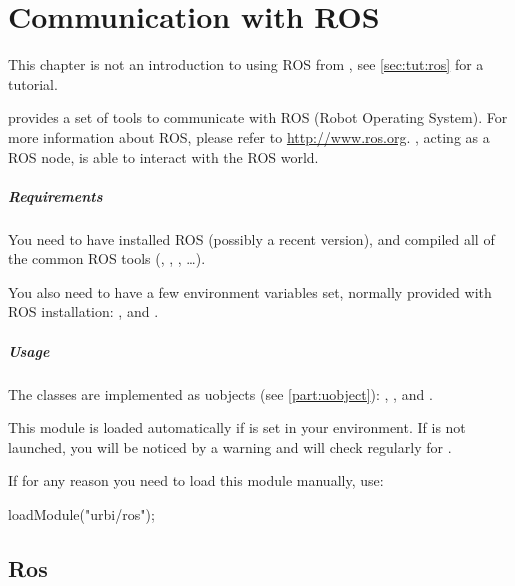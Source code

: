 
\chapter{Communication with ROS}
\label{sec:specs:ros}

This chapter is not an introduction to using ROS from \urbi, see
\autoref{sec:tut:ros} for a tutorial.

\urbi provides a set of tools to communicate with ROS (Robot Operating
System). For more information about ROS, please refer to
\url{http://www.ros.org}.  \urbi, acting as a ROS node, is able to interact
with the ROS world.


\paragraph{Requirements}

You need to have installed ROS (possibly a recent version), and compiled all
of the common ROS tools (, ,
, \ldots).

You also need to have a few environment variables set, normally provided
with ROS installation: ,  and
.


\paragraph{Usage}

The classes are implemented as uobjects (see \autoref{part:uobject}):
, , and .

This module is loaded automatically if  is set  in
your environment. If  is not launched, you will be noticed
by a warning and \urbi will check regularly for .

If for any reason you need to load this module manually, use:
\begin{urbiunchecked}
loadModule("urbi/ros");
\end{urbiunchecked}


\section{Ros}

